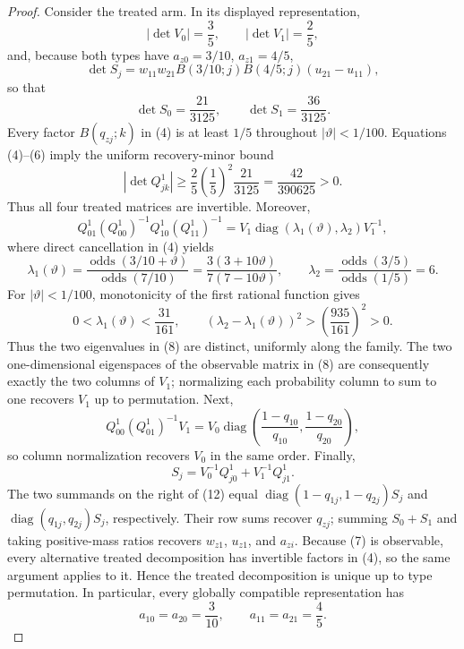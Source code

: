 \documentclass{article}
\begin{document}
\begin{proof}
Consider the treated arm. In its displayed representation,
\[
 |\det V_0|=\frac35,
 \qquad |\det V_1|=\frac25,
 \tag{5}
\]
and, because both types have \(a_{z0}=3/10\), \(a_{z1}=4/5\),
\[
 \det S_j=w_{11}w_{21}B(3/10;j)B(4/5;j)(u_{21}-u_{11}),
\]
so that
\[
 \det S_0=\frac{21}{3125},
 \qquad \det S_1=\frac{36}{3125}.
 \tag{6}
\]
Every factor \(B(q_{zj};k)\) in (4) is at least \(1/5\) throughout \(|\vartheta|<1/100\). Equations (4)--(6) imply the uniform recovery-minor bound
\[
 |\det Q_{jk}^{1}|\ge
 \frac25\left(\frac15\right)^2\frac{21}{3125}
 =\frac{42}{390625}>0.
 \tag{7}
\]
Thus all four treated matrices are invertible. Moreover,
\[
 Q_{01}^{1}(Q_{00}^{1})^{-1}Q_{10}^{1}(Q_{11}^{1})^{-1}
 =V_1\operatorname{diag}(\lambda_1(\vartheta),\lambda_2)V_1^{-1},
 \tag{8}
\]
where direct cancellation in (4) yields
\[
 \lambda_1(\vartheta)
 =\frac{\operatorname{odds}(3/10+\vartheta)}{\operatorname{odds}(7/10)}
 =\frac{3(3+10\vartheta)}{7(7-10\vartheta)},
 \qquad
 \lambda_2
 =\frac{\operatorname{odds}(3/5)}{\operatorname{odds}(1/5)}=6.
 \tag{9}
\]
For \(|\vartheta|<1/100\), monotonicity of the first rational function gives
\[
 0<\lambda_1(\vartheta)<\frac{31}{161},
 \qquad
 (\lambda_2-\lambda_1(\vartheta))^2>\left(\frac{935}{161}\right)^2>0.
 \tag{10}
\]
Thus the two eigenvalues in (8) are distinct, uniformly along the family. The two one-dimensional eigenspaces of the observable matrix in (8) are consequently exactly the two columns of \(V_1\); normalizing each probability column to sum to one recovers \(V_1\) up to permutation. Next,
\[
 Q_{00}^{1}(Q_{01}^{1})^{-1}V_1
 =V_0\operatorname{diag}\left(\frac{1-q_{10}}{q_{10}},\frac{1-q_{20}}{q_{20}}\right),
 \tag{11}
\]
so column normalization recovers \(V_0\) in the same order. Finally,
\[
 S_j=V_0^{-1}Q_{j0}^{1}+V_1^{-1}Q_{j1}^{1}.
 \tag{12}
\]
The two summands on the right of (12) equal \(\operatorname{diag}(1-q_{1j},1-q_{2j})S_j\) and \(\operatorname{diag}(q_{1j},q_{2j})S_j\), respectively. Their row sums recover \(q_{zj}\); summing \(S_0+S_1\) and taking positive-mass ratios recovers \(w_{z1}\), \(u_{z1}\), and \(a_{zi}\). Because (7) is observable, every alternative treated decomposition has invertible factors in (4), so the same argument applies to it. Hence the treated decomposition is unique up to type permutation. In particular, every globally compatible representation has
\[
 a_{10}=a_{20}=\frac3{10},
 \qquad a_{11}=a_{21}=\frac45.
 \tag{13}
\]


\end{proof}
\end{document}
